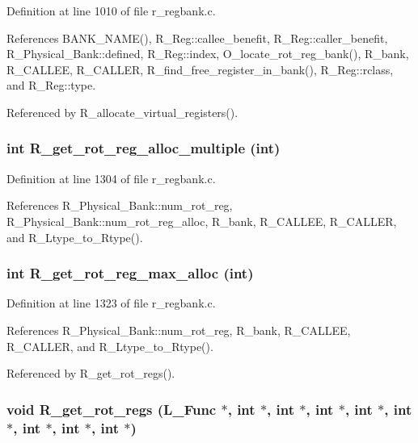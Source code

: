 Definition at line 1010 of file r\_\-regbank.c.

References BANK\_\-NAME(), R\_\-Reg::callee\_\-benefit, R\_\-Reg::caller\_\-benefit, R\_\-Physical\_\-Bank::defined, R\_\-Reg::index, O\_\-locate\_\-rot\_\-reg\_\-bank(), R\_\-bank, R\_\-CALLEE, R\_\-CALLER, R\_\-find\_\-free\_\-register\_\-in\_\-bank(), R\_\-Reg::rclass, and R\_\-Reg::type.

Referenced by R\_\-allocate\_\-virtual\_\-registers().
\subsubsection{\setlength{\rightskip}{0pt plus 5cm}int R\_\-get\_\-rot\_\-reg\_\-alloc\_\-multiple (int)}\label{r__regproto_8h_372325e91c44ed5cb71baabecc0cb1be}




Definition at line 1304 of file r\_\-regbank.c.

References R\_\-Physical\_\-Bank::num\_\-rot\_\-reg, R\_\-Physical\_\-Bank::num\_\-rot\_\-reg\_\-alloc, R\_\-bank, R\_\-CALLEE, R\_\-CALLER, and R\_\-Ltype\_\-to\_\-Rtype().
\subsubsection{\setlength{\rightskip}{0pt plus 5cm}int R\_\-get\_\-rot\_\-reg\_\-max\_\-alloc (int)}\label{r__regproto_8h_ae80669f2124acd70db4cca38890c978}




Definition at line 1323 of file r\_\-regbank.c.

References R\_\-Physical\_\-Bank::num\_\-rot\_\-reg, R\_\-bank, R\_\-CALLEE, R\_\-CALLER, and R\_\-Ltype\_\-to\_\-Rtype().

Referenced by R\_\-get\_\-rot\_\-regs().
\subsubsection{\setlength{\rightskip}{0pt plus 5cm}void R\_\-get\_\-rot\_\-regs (L\_\-Func $\ast$, int $\ast$, int $\ast$, int $\ast$, int $\ast$, int $\ast$, int $\ast$, int $\ast$, int $\ast$)}\label{r__regproto_8h_bd378da6a7d6b0b87b1786b98b4620ee}





